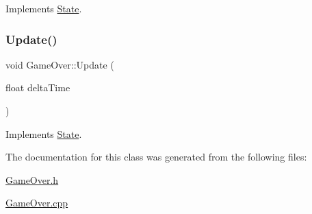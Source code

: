 Implements \mbox{\hyperlink{classState_a7ab4d8c6aa239a17ed579d89a209b156}{State}}.

\mbox{\label{classGameOver_a960c8ff2705f1fe49b49c717ee68fbc6}} 
\subsubsection{\texorpdfstring{Update()}{Update()}}
{\footnotesize\ttfamily void Game\+Over\+::\+Update (\begin{DoxyParamCaption}\item[{float}]{delta\+Time }\end{DoxyParamCaption})\hspace{0.3cm}{\ttfamily [virtual]}}



Implements \mbox{\hyperlink{classState_a770f40188fdfc64bc95a5166fef12e02}{State}}.



The documentation for this class was generated from the following files\+:\begin{DoxyCompactItemize}
\item 
\mbox{\hyperlink{GameOver_8h}{Game\+Over.\+h}}\item 
\mbox{\hyperlink{GameOver_8cpp}{Game\+Over.\+cpp}}\end{DoxyCompactItemize}
